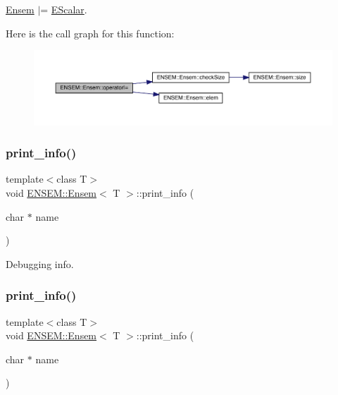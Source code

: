 \mbox{\hyperlink{classENSEM_1_1Ensem}{Ensem}} $\vert$= \mbox{\hyperlink{classENSEM_1_1EScalar}{E\+Scalar}}. 

Here is the call graph for this function\+:
\nopagebreak
\begin{figure}[H]
\begin{center}
\leavevmode
\includegraphics[width=350pt]{d7/d3e/classENSEM_1_1Ensem_aa0c3f80e393be46c6f0a1cb3bbdfb170_cgraph}
\end{center}
\end{figure}
\mbox{\label{classENSEM_1_1Ensem_a85302bace1110e35249c88486f88d80c}} 
\subsubsection{\texorpdfstring{print\_info()}{print\_info()}\hspace{0.1cm}{\footnotesize\ttfamily [1/2]}}
{\footnotesize\ttfamily template$<$class T$>$ \\
void \mbox{\hyperlink{classENSEM_1_1Ensem}{E\+N\+S\+E\+M\+::\+Ensem}}$<$ T $>$\+::print\+\_\+info (\begin{DoxyParamCaption}\item[{char $\ast$}]{name }\end{DoxyParamCaption})\hspace{0.3cm}{\ttfamily [inline]}}



Debugging info. 

\mbox{\label{classENSEM_1_1Ensem_a85302bace1110e35249c88486f88d80c}} 
\subsubsection{\texorpdfstring{print\_info()}{print\_info()}\hspace{0.1cm}{\footnotesize\ttfamily [2/2]}}
{\footnotesize\ttfamily template$<$class T$>$ \\
void \mbox{\hyperlink{classENSEM_1_1Ensem}{E\+N\+S\+E\+M\+::\+Ensem}}$<$ T $>$\+::print\+\_\+info (\begin{DoxyParamCaption}\item[{char $\ast$}]{name }\end{DoxyParamCaption})\hspace{0.3cm}{\ttfamily [inline]}}



